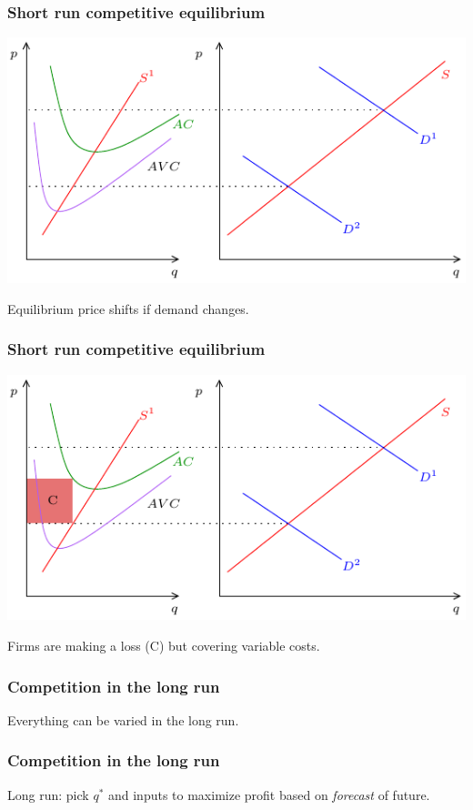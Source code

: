 \documentclass[xcolor=pdftex,dvipsnames]{beamer}
\begin{document}
\begin{frame}\frametitle{Short run competitive equilibrium}
\begin{center}
\includegraphics{pics/Equilibrium2}
\end{center}
Equilibrium price shifts if demand changes.
\end{frame} 


\begin{frame}\frametitle{Short run competitive equilibrium}
\begin{center}
\includegraphics{pics/Equilibrium3}
 \end{center}
Firms are making a loss (C) but covering variable costs.
\end{frame} 




\begin{frame}\frametitle{Competition in the long run}
Everything can be varied in the long run.

\bigskip
{}
\end{frame} 


\begin{frame}\frametitle{Competition in the long run}
Long run: pick $q^*$ and  inputs to maximize profit based on
\emph{forecast} of future.

\bigskip

\bigskip

\end{frame}
\end{document}
